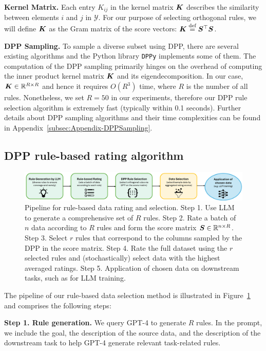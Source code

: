 \documentclass{article}
\newcommand{\bydef}{\stackrel{\text{def}}{=}}
\begin{document}
\textbf{Kernel Matrix.} Each entry $K_{ij}$ in the kernel matrix ${\bm{K}}$ describes the similarity between elements $i$ and $j$ in $\mathcal{Y}$. For our purpose of selecting orthogonal rules, we will define ${\bm{K}}$ as the Gram matrix of the score vectors: $\mK \bydef\mS^\top \mS$.

\textbf{DPP Sampling.} To sample a diverse subset using DPP, there are several existing algorithms \citep{hough2006determinantal, kulesza2012determinantal, tremblay2018optimized} and the Python library \texttt{DPPy} \citep{GPBV19} implements some of them. The computation of the DPP sampling primarily hinges on the overhead of computing the inner product kernel matrix ${\bm{K}}$ and its eigendecomposition. In our case, ${\bm{K}} \in \mathbb{R}^{R \times R}$ and hence it requires $O(R^3)$ time, where $R$ is the number of all rules. Nonetheless, we set $R=50$ in our experiments, therefore our DPP rule selection algorithm is extremely fast (typically within 0.1 seconds). Further details about DPP sampling algorithms and their time complexities can be found in Appendix~\ref{subsec:Appendix-DPPSampling}.


\subsection{DPP rule-based rating algorithm}\label{subsec:Algo}
\begin{figure}[H]
    \centering
    \includegraphics[width=1.0\textwidth]{figures/pipeline.pdf}
    \caption{Pipeline for rule-based data rating and selection. Step 1. Use LLM to generate a comprehensive set of $R$ rules. Step 2. Rate a batch of $n$ data according to $R$ rules and form the score matrix ${\bm{S}} \in \mathbb{R}^{n \times R}$. Step 3. Select $r$ rules that correspond to the columns sampled by the DPP in the score matrix. Step 4. Rate the full dataset using the $r$ selected rules and (stochastically) select data with the highest averaged ratings. Step 5. Application of chosen data on downstream tasks, such as for LLM training.}
    \label{fig:pipeline}
\end{figure}

The pipeline of our rule-based data selection method is illustrated in Figure~\ref{fig:pipeline} and comprises the following steps:

\textbf{Step 1. Rule generation.}
We query GPT-4 to generate $R$ rules. In the prompt, we include the goal, the description of the source data, and the description of the downstream task to help GPT-4 generate relevant task-related rules.
\end{document}
